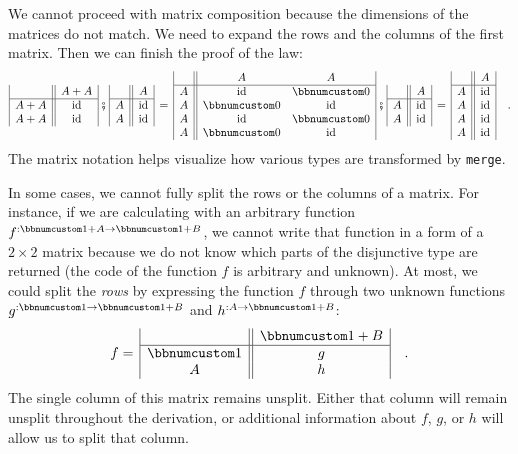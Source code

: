 We cannot proceed with matrix composition because the dimensions of
the matrices do not match. We need to expand the rows and the columns
of the first matrix. Then we can finish the proof of the law:
\[
\begin{array}{|c||c|}
 & A+A\\
\hline A+A & \text{id}\\
A+A & \text{id}
\end{array}\,\bef\,\begin{array}{|c||c|}
 & A\\
\hline A & \text{id}\\
A & \text{id}
\end{array}\,=\,\begin{array}{|c||cc|}
 & A & A\\
\hline A & \text{id} & \bbnum 0\\
A & \bbnum 0 & \text{id}\\
A & \text{id} & \bbnum 0\\
A & \bbnum 0 & \text{id}
\end{array}\,\bef\,\begin{array}{|c||c|}
 & A\\
\hline A & \text{id}\\
A & \text{id}
\end{array}\,=\,\begin{array}{|c||c|}
 & A\\
\hline A & \text{id}\\
A & \text{id}\\
A & \text{id}\\
A & \text{id}
\end{array}\quad.
\]
The matrix notation helps visualize how various types are transformed
by \lstinline!merge!.

In some cases, we cannot fully split the rows or the columns of a
matrix. For instance, if we are calculating with an arbitrary function
$f^{:\bbnum 1+A\rightarrow\bbnum 1+B}$, we cannot write that function
in a form of a $2\times2$ matrix because we do not know which parts
of the disjunctive type are returned (the code of the function $f$
is arbitrary and unknown). At most, we could split the \emph{rows}
by expressing the function $f$ through two unknown functions $g^{:\bbnum 1\rightarrow\bbnum 1+B}$
and $h^{:A\rightarrow\bbnum 1+B}$:
\[
f=\,\begin{array}{|c||c|}
 & \bbnum 1+B\\
\hline \bbnum 1 & g\\
A & h
\end{array}\quad.
\]
The single column of this matrix remains unsplit. Either that column
will remain unsplit throughout the derivation, or additional information
about $f$, $g$, or $h$ will allow us to split that column.

